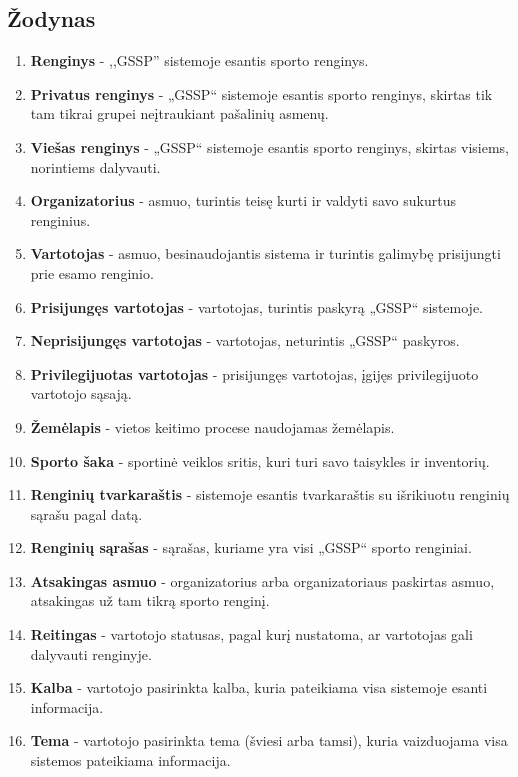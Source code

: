\documentclass{VUMIFPSkursinis}
\begin{document}
        \subsection*{Žodynas} \label{strukturinisDSModelis_zodynas}
            \begin{enumerate}[label=\textbf{E\arabic*.}]
                \item \textbf{Renginys} - ,,GSSP'' sistemoje esantis sporto renginys.
				\item \textbf{Privatus renginys} - „GSSP“ sistemoje esantis sporto renginys, skirtas tik tam tikrai grupei neįtraukiant pašalinių asmenų.
				\item \textbf{Viešas renginys} - „GSSP“ sistemoje esantis sporto renginys, skirtas visiems, norintiems dalyvauti.
                \item \textbf{Organizatorius} - asmuo, turintis teisę kurti ir valdyti savo sukurtus renginius.
                \item \textbf{Vartotojas} - asmuo, besinaudojantis sistema ir turintis galimybę prisijungti prie 
				esamo renginio.
				\item \textbf{Prisijungęs vartotojas} - vartotojas, turintis paskyrą „GSSP“ sistemoje.
				\item \textbf{Neprisijungęs vartotojas} - vartotojas, neturintis „GSSP“ paskyros.
				\item \textbf{Privilegijuotas vartotojas} - prisijungęs vartotojas, įgijęs privilegijuoto vartotojo sąsają.
                \item \textbf{Žemėlapis} - vietos keitimo procese naudojamas žemėlapis.
				\item \textbf{Sporto šaka} - sportinė veiklos sritis, kuri turi savo taisykles ir inventorių.
				\item \textbf{Renginių tvarkaraštis} - sistemoje esantis tvarkaraštis su išrikiuotu renginių sąrašu pagal datą.
				\item \textbf{Renginių sąrašas} - sąrašas, kuriame yra visi „GSSP“ sporto renginiai.
				\item \textbf{Atsakingas asmuo} - organizatorius arba organizatoriaus paskirtas asmuo, atsakingas už tam tikrą sporto renginį.
				\item \textbf{Reitingas} - vartotojo statusas, pagal kurį nustatoma, ar vartotojas gali dalyvauti renginyje.
				\item \textbf{Kalba} - vartotojo pasirinkta kalba, kuria pateikiama visa sistemoje esanti informacija.
				\item \textbf{Tema} - vartotojo pasirinkta tema (šviesi arba tamsi), kuria vaizduojama visa sistemos pateikiama informacija.

\end{enumerate}
\end{document}
